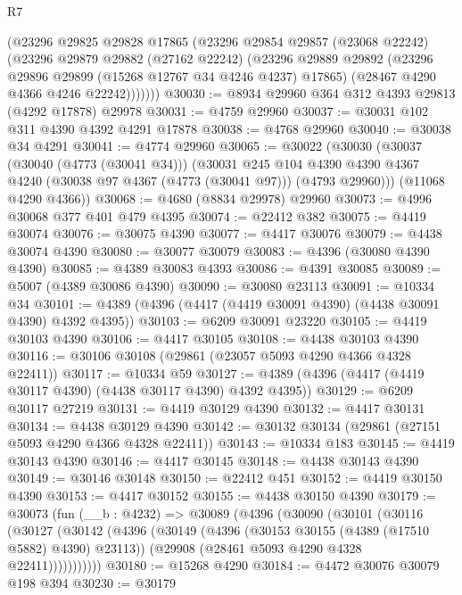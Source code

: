 \begin{lexlean}{R7}
\begin{coremodule}
        (@23296
          @29825
          @29828
          @17865
          (@23296
            @29854
            @29857
            (@23068 @22242)
            (@23296
              @29879
              @29882
              (@27162 @22242)
              (@23296
                @29889
                @29892
                (@23296 @29896 @29899 (@15268 @12767 @34 @4246 @4237) @17865)
                (@28467 @4290 @4366 @4246 @22242)))))))
@30030 := @8934 @29960 @364 @312 @4393 @29813 (@4292 @17878) @29978
@30031 := @4759 @29960
@30037 := @30031 @102 @311 @4390 @4392 @4291 @17878
@30038 := @4768 @29960
@30040 := @30038 @34 @4291
@30041 := @4774 @29960
@30065 := @30022
    (@30030
      (@30037
        (@30040 (@4773 (@30041 @34)))
        (@30031
          @245
          @104
          @4390
          @4390
          @4367
          @4240
          (@30038 @97 @4367 (@4773 (@30041 @97)))
          (@4793 @29960)))
      (@11068 @4290 @4366))
@30068 := @4680 (@8834 @29978) @29960
@30073 := @4996 @30068 @377 @401 @479 @4395
@30074 := @22412 @382
@30075 := @4419 @30074
@30076 := @30075 @4390
@30077 := @4417 @30076
@30079 := @4438 @30074 @4390
@30080 := @30077 @30079
@30083 := @4396 (@30080 @4390 @4390)
@30085 := @4389 @30083 @4393
@30086 := @4391 @30085
@30089 := @5007 (@4389 @30086 @4390)
@30090 := @30080 @23113
@30091 := @10334 @34
@30101 := @4389 (@4396 (@4417 (@4419 @30091 @4390) (@4438 @30091 @4390) @4392 @4395))
@30103 := @6209 @30091 @23220
@30105 := @4419 @30103 @4390
@30106 := @4417 @30105
@30108 := @4438 @30103 @4390
@30116 := @30106 @30108 (@29861 (@23057 @5093 @4290 @4366 @4328 @22411))
@30117 := @10334 @59
@30127 := @4389 (@4396 (@4417 (@4419 @30117 @4390) (@4438 @30117 @4390) @4392 @4395))
@30129 := @6209 @30117 @27219
@30131 := @4419 @30129 @4390
@30132 := @4417 @30131
@30134 := @4438 @30129 @4390
@30142 := @30132 @30134 (@29861 (@27151 @5093 @4290 @4366 @4328 @22411))
@30143 := @10334 @183
@30145 := @4419 @30143 @4390
@30146 := @4417 @30145
@30148 := @4438 @30143 @4390
@30149 := @30146 @30148
@30150 := @22412 @451
@30152 := @4419 @30150 @4390
@30153 := @4417 @30152
@30155 := @4438 @30150 @4390
@30179 := @30073
    (fun (__b : @4232) =>
    @30089
      (@4396
        (@30090
          (@30101
            (@30116
              (@30127
                (@30142
                  (@4396
                    (@30149
                      (@4396 (@30153 @30155 (@4389 (@17510 @5882) @4390) @23113))
                      (@29908 (@28461 @5093 @4290 @4328 @22411)))))))))))
@30180 := @15268 @4290
@30184 := @4472 @30076 @30079 @198 @394
@30230 := @30179

\end{coremodule}
\end{lexlean}
